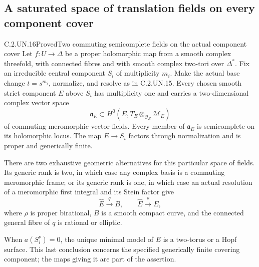 \subsection{A saturated space of translation fields on every component cover}

\begin{statement}{C.2.UN.16}{Proved}{Two commuting semicomplete fields on the actual component cover}
Let $f:U\to\Delta$ be a proper holomorphic map from a smooth
complex threefold, with connected fibres and with smooth complex
two-tori over $\Delta^*$. Fix an irreducible central component $S_i$
of multiplicity $m_i$. Make the actual base change $t=s^{m_i}$,
normalize, and resolve as in C.2.UN.15. Every chosen smooth strict
component $E$ above $S_i$ has multiplicity one and carries a
two-dimensional complex vector space
\[
 \mathfrak a_E\subset
 H^0(E,T_E\otimes_{\mathcal O_E}\mathcal M_E)
 \tag{C.CF.1}
\]
of commuting meromorphic vector fields. Every member of
$\mathfrak a_E$ is semicomplete on its holomorphic locus.
The map $E\to S_i$ factors through normalization and is
proper and generically finite.

There are two exhaustive geometric alternatives for this particular
space of fields. Its generic rank is two, in which case any complex
basis is a commuting meromorphic frame; or its generic rank is one,
in which case an actual resolution of a meromorphic first integral
and its Stein factor give
\[
 \widehat E\xrightarrow{\ q\ }B,
 \qquad \widehat E\xrightarrow{\rho}E,
 \tag{C.CF.2}
\]
where $\rho$ is proper birational, $B$ is a smooth compact curve,
and the connected general fibre of $q$ is rational or elliptic.

When $a(S_i^\nu)=0$, the unique minimal model of $E$ is a
two-torus or a Hopf surface. This last conclusion concerns the
specified generically finite covering component; the maps giving
it are part of the assertion.
\end{statement}

